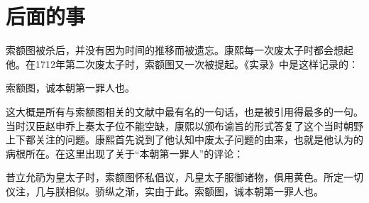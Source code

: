 \begin{sectionnotes}








\end{sectionnotes}
\section{后面的事}


索额图被杀后，并没有因为时间的推移而被遗忘。康熙每一次废太子时都会想起他。在1712年第二次废太子时，索额图又一次被提起。《实录》中是这样记录的：



\begin{bookquote}索额图，诚本朝第一罪人也。\end{bookquote}


这大概是所有与索额图相关的文献中最有名的一句话，也是被引用得最多的一句。当时汉臣赵申乔上奏太子位不能空缺，康熙以颁布谕旨的形式答复了这个当时朝野上下都关注的问题。康熙首先说到了他认知中废太子问题的由来，也就是他认为的病根所在。在这里出现了关于“本朝第一罪人”的评论：



\begin{bookquote}昔立允礽为皇太子时，索额图怀私倡议，凡皇太子服御诸物，俱用黄色。所定一切仪注，几与朕相似。骄纵之渐，实由于此。索额图，诚本朝第一罪人也。\end{bookquote}

